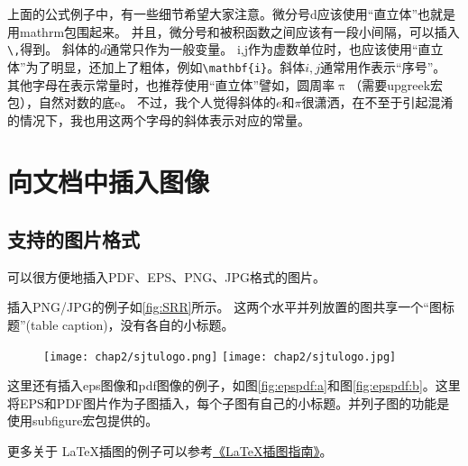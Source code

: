 上面的公式例子中，有一些细节希望大家注意。微分号d应该使用“直立体”也就是用mathrm包围起来。
并且，微分号和被积函数之间应该有一段小间隔，可以插入\verb+\,+得到。
斜体的$d$通常只作为一般变量。
i,j作为虚数单位时，也应该使用“直立体”为了明显，还加上了粗体，例如\verb+\mathbf{i}+。斜体$i,j$通常用作表示“序号”。
其他字母在表示常量时，也推荐使用“直立体”譬如，圆周率$\uppi$（需要upgreek宏包），自然对数的底$\mathrm{e}$。
不过，我个人觉得斜体的$e$和$\pi$很潇洒，在不至于引起混淆的情况下，我也用这两个字母的斜体表示对应的常量。


\section{向文档中插入图像}
\label{sec:insertimage}

\subsection{支持的图片格式}
\label{sec:imageformat}

\XeTeX 可以很方便地插入PDF、EPS、PNG、JPG格式的图片。

插入PNG/JPG的例子如\ref{fig:SRR}所示。
这两个水平并列放置的图共享一个“图标题”(table caption)，没有各自的小标题。

\begin{figure}[!htp]
  \centering
  \texttt{[image: chap2/sjtulogo.png]}
  \hspace{1cm}
  \texttt{[image: chap2/sjtulogo.jpg]}
\end{figure}

这里还有插入eps图像和pdf图像的例子，如图\ref{fig:epspdf:a}和图\ref{fig:epspdf:b}。这里将EPS和PDF图片作为子图插入，每个子图有自己的小标题。并列子图的功能是使用subfigure宏包提供的。

\begin{figure}
  \centering
  \hspace{1in}
\end{figure}

更多关于 \LaTeX 插图的例子可以参考\href{http://www.cs.duke.edu/junhu/Graphics3.pdf}{《\LaTeX 插图指南》}。

